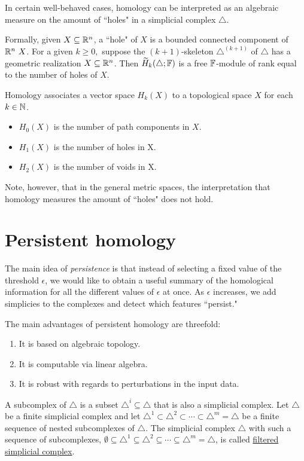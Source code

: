 \begin{defn}
In certain well-behaved cases, homology can be interpreted as an algebraic measure on the amount of ``holes" in a simplicial complex $\triangle$.

Formally, given $X\subseteq \mathbb R^n$, a ``hole" of $X$ is a bounded connected component of $\RR^n\ X$. For a given $k\geq 0,$ suppose the $(k+1)$-skeleton $\triangle^{(k+1)}$ of $\triangle$ has a geometric realization $X \subseteq \mathbb R^n$. Then $\widetilde{H}_k(\triangle;\mathbb{F})$ is a free $\mathbb{F}$-module of rank equal to the number of holes of $X$. 

Homology associates a vector space $H_k(X)$ to a topological space $X$ for each $k\in \mathbb N$.
\begin{itemize}
    \item $H_0(X)$ is the number of path components in $X$.
    \item $H_1(X)$ is the number of holes in X.
    \item $H_2(X)$ is the number of voids in X.
\end{itemize}
\begin{rmk}
Note, however, that in the general metric spaces, the interpretation that homology measures the amount of ``holes" does not hold.
\end{rmk}
\end{defn}

\section{Persistent homology}

The main idea of \textit{persistence} is that instead of selecting a fixed value of the threshold $\epsilon$, we would like to obtain a useful summary of the homological information for all the different values of $\epsilon$ at once. As $\epsilon$ increases, we add simplicies to the complexes and detect which features ``persist."

The main advantages of persistent homology are threefold: 
\begin{enumerate}
    \item It is based on algebraic topology.
    \item It is computable via linear algebra.
    \item It is robust with regards to perturbations in the input data. 
\end{enumerate}

\begin{defn}
\label{filtered}
A subcomplex of $\triangle$ is a subset $\triangle^i \subseteq \triangle$ that is also a simplicial complex. 
Let $\triangle$ be a finite simplicial complex and let $\triangle^1 \subset \triangle^2 \subset \cdots \subset \triangle^m = \triangle$ be a finite sequence of nested subcomplexes of $\triangle$. The simplicial complex $\triangle$ with such a sequence of subcomplexes, $\emptyset \subseteq \triangle^1 \subseteq \triangle^2 \subseteq \cdots \subseteq \triangle^m = \triangle$, is called \underline{filtered simplicial complex}.

\end{defn}

